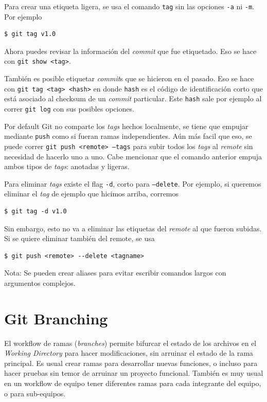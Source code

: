 \documentclass[spanish, 12pt, a4paper]{article}
\begin{document}
Para crear una etiqueta ligera, se usa el comando \texttt{tag} sin las opciones \texttt{-a} ni \texttt{-m}.
Por ejemplo 
\begin{lstlisting}
$ git tag v1.0
\end{lstlisting}

Ahora puedes revisar la información del \textit{commit} que fue etiquetado.
Eso se hace con \texttt{git show <tag>}.

También es posible etiquetar \textit{commit}s que se hicieron en el pasado.
Eso se hace con \texttt{git tag <tag> <hash>} en donde \texttt{hash} es el código de identificación corto que está asociado al checksum de un \textit{commit} particular.
Este \texttt{hash} sale por ejemplo al correr \texttt{git log} con sus posibles opciones.

Por default Git no comparte los \textit{tags} hechos localmente, se tiene que empujar mediante \texttt{push} como si fueran ramas independientes.
Aún más facil que eso, se puede correr \texttt{git push <remote> --tags} para subir todos los \textit{tags} al \textit{remote} sin necesidad de hacerlo uno a uno.
Cabe mencionar que el comando anterior empuja ambos tipos de \textit{tags}: anotadas y ligeras.

Para eliminar \textit{tags} existe el flag \texttt{-d}, corto para \texttt{--delete}.
Por ejemplo, si queremos eliminar el \textit{tag} de ejemplo que hicimos arriba, corremos
\begin{lstlisting}
$ git tag -d v1.0
\end{lstlisting}
Sin embargo, esto no va a eliminar las etiquetas del \textit{remote} al que fueron subidas.
Si se quiere eliminar también del remote, se usa
\begin{lstlisting}
$ git push <remote> --delete <tagname>
\end{lstlisting}


Nota: Se pueden crear aliases para evitar escribir comandos largos con argumentos complejos.

\section{Git Branching}
El workflow de ramas (\textit{branches}) permite bifurcar el estado de los archivos en el \textit{Working Directory} para hacer modificaciones, sin arruinar el estado de la rama principal.
Es usual crear ramas para desarrollar nuevas funciones, o incluso para hacer pruebas sin temor de arruinar un proyecto funcional.
También es muy usual en un workflow de equipo tener diferentes ramas para cada integrante del equipo, o para sub-equipos.
\end{document}
